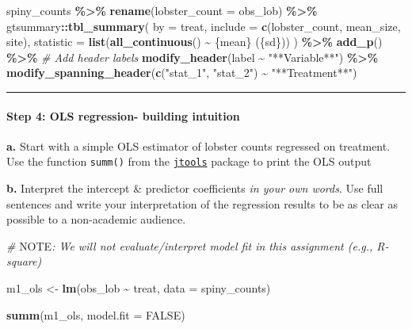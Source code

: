 \documentclass[
]{article}
\newenvironment{Shaded}{\begin{snugshade}}{\end{snugshade}}
\newcommand{\AlertTok}[1]{\textcolor[rgb]{0.94,0.16,0.16}{#1}}
\newcommand{\AttributeTok}[1]{\textcolor[rgb]{0.13,0.29,0.53}{#1}}
\newcommand{\CommentTok}[1]{\textcolor[rgb]{0.56,0.35,0.01}{\textit{#1}}}
\newcommand{\ConstantTok}[1]{\textcolor[rgb]{0.56,0.35,0.01}{#1}}
\newcommand{\FunctionTok}[1]{\textcolor[rgb]{0.13,0.29,0.53}{\textbf{#1}}}
\newcommand{\NormalTok}[1]{#1}
\newcommand{\OtherTok}[1]{\textcolor[rgb]{0.56,0.35,0.01}{#1}}
\newcommand{\SpecialCharTok}[1]{\textcolor[rgb]{0.81,0.36,0.00}{\textbf{#1}}}
\newcommand{\StringTok}[1]{\textcolor[rgb]{0.31,0.60,0.02}{#1}}
\begin{document}
\begin{Shaded}
\begin{Highlighting}[]
\NormalTok{spiny\_counts }\SpecialCharTok{\%\textgreater{}\%} 
    \FunctionTok{rename}\NormalTok{(}\AttributeTok{lobster\_count =}\NormalTok{ obs\_lob) }\SpecialCharTok{\%\textgreater{}\%} 
\NormalTok{    gtsummary}\SpecialCharTok{::}\FunctionTok{tbl\_summary}\NormalTok{(}
        \AttributeTok{by =}\NormalTok{ treat, }
        \AttributeTok{include =} \FunctionTok{c}\NormalTok{(lobster\_count, mean\_size, site), }
        \AttributeTok{statistic =} \FunctionTok{list}\NormalTok{(}\FunctionTok{all\_continuous}\NormalTok{() }\SpecialCharTok{\textasciitilde{}} \StringTok{\textquotesingle{}\{mean\} (\{sd\})\textquotesingle{}}\NormalTok{)}
\NormalTok{    ) }\SpecialCharTok{\%\textgreater{}\%} 
    \FunctionTok{add\_p}\NormalTok{() }\SpecialCharTok{\%\textgreater{}\%} 
    \CommentTok{\# Add header labels }
    \FunctionTok{modify\_header}\NormalTok{(label }\SpecialCharTok{\textasciitilde{}} \StringTok{"**Variable**"}\NormalTok{) }\SpecialCharTok{\%\textgreater{}\%}
    \FunctionTok{modify\_spanning\_header}\NormalTok{(}\FunctionTok{c}\NormalTok{(}\StringTok{"stat\_1"}\NormalTok{, }\StringTok{"stat\_2"}\NormalTok{) }\SpecialCharTok{\textasciitilde{}} \StringTok{"**Treatment**"}\NormalTok{) }
\end{Highlighting}
\end{Shaded}

\begin{center}\rule{0.5\linewidth}{0.5pt}\end{center}

\paragraph{Step 4: OLS regression- building
intuition}\label{step-4-ols-regression--building-intuition}

\textbf{a.} Start with a simple OLS estimator of lobster counts
regressed on treatment. Use the function \texttt{summ()} from the
\href{https://jtools.jacob-long.com/}{\texttt{jtools}} package to print
the OLS output

\textbf{b.} Interpret the intercept \& predictor coefficients \emph{in
your own words}. Use full sentences and write your interpretation of the
regression results to be as clear as possible to a non-academic
audience.

\begin{Shaded}
\begin{Highlighting}[]
\CommentTok{\# }\AlertTok{NOTE}\CommentTok{: We will not evaluate/interpret model fit in this assignment (e.g., R{-}square)}

\NormalTok{m1\_ols }\OtherTok{\textless{}{-}} \FunctionTok{lm}\NormalTok{(obs\_lob }\SpecialCharTok{\textasciitilde{}}\NormalTok{ treat, }\AttributeTok{data =}\NormalTok{ spiny\_counts)}

\FunctionTok{summ}\NormalTok{(m1\_ols, }\AttributeTok{model.fit =} \ConstantTok{FALSE}\NormalTok{) }
\end{Highlighting}
\end{Shaded}
\end{document}
